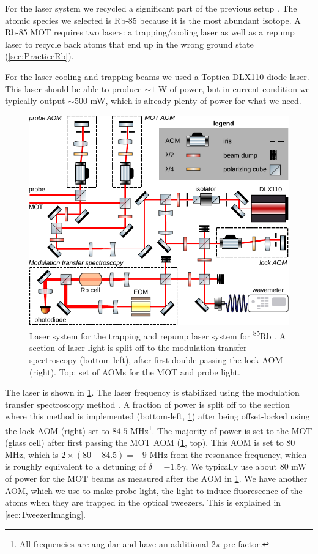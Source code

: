For the laser system we recycled a significant part of the previous setup \cite{Reijnders2010}.
The atomic species we selected is Rb-85 because it is the most abundant isotope. 
A Rb-85 MOT requires two lasers: a trapping/cooling laser as well as a repump laser to recycle back atoms that end up in the wrong ground state (\cref{sec:PracticeRb}).

For the laser cooling and trapping beams we used a Toptica DLX110 diode laser. This laser should be able to produce $\sim 1$ W of power, but in current condition we typically output $\sim 500$ mW, which is already plenty of power for what we need. 
\begin{figure}[t]
    \centering
    \includegraphics[width=\linewidth]{figures/RbLaserSetup.pdf}
    \caption{Laser system for the trapping and repump laser system for \textsuperscript{85}Rb \cite{Reijnders2010}.
    A section of laser light is split off to the modulation transfer spectroscopy (bottom left), after first double passing the lock \ac{AOM} (right). 
    Top: set of AOMs for the MOT and probe light.
    }
    \label{fig:RbLaserSetup}
\end{figure}
The laser is shown in \cref{fig:RbLaserSetup}.
The laser frequency is stabilized using the modulation transfer spectroscopy method \cite{Reijnders2010,McCarron2008}.
A fraction of power is split off to the section where this method is implemented  (bottom-left, \cref{fig:RbLaserSetup}) after being offset-locked using the lock \ac{AOM} (right) set to $84.5$ MHz\footnote{All frequencies are angular and have an additional $2\pi$ pre-factor.}.
The majority of power is set to the MOT (glass cell) after first passing the MOT AOM (\cref{fig:RbLaserSetup}, top).
This AOM is set to 80 MHz, which is $2 \times (80 - 84.5) = -9$ MHz from the resonance frequency, which is roughly equivalent to a detuning of $\delta = -1.5 \gamma$.
We typically use about $80$ mW of power for the MOT beams as measured after the \ac{AOM} in \cref{fig:RbLaserSetup}.
We have another AOM, which we use to make probe light, the light to induce fluorescence of the atoms when they are trapped in the optical tweezers.
This is explained in \cref{sec:TweezerImaging}.


